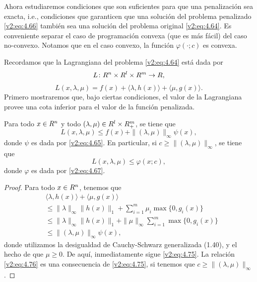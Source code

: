 Ahora estudiaremos condiciones que son suficientes para que una penalización sea exacta, i.e., condiciones que garanticen que una solución del problema penalizado \eqref{v2:eq:4.66} también sea una solución del problema original \eqref{v2:eq:4.64}. Es conveniente separar el caso de programación convexa (que es más fácil) del caso no-convexo. Notamos que en el caso convexo, la función $\varphi(\cdot; c)$ es convexa.

Recordamos que la Lagrangiana del problema \eqref{v2:eq:4.64} está dada por
\[
    L \colon R^n \times R^l \times R^m \to R,
\]
\[
    L(x, \lambda, \mu) = f(x) + \langle \lambda, h(x) \rangle + \langle \mu, g(x) \rangle.
\]
Primero mostraremos que, bajo ciertas condiciones, el valor de la Lagrangiana provee una cota inferior para el valor de la función penalizada.

\begin{proposition}\label{v2:prop:4.3.2}
    Para todo $x \in R^n$ y todo $(\lambda, \mu) \in R^l \times R^m_+$, se tiene que
    \begin{equation}
        L(x, \lambda, \mu) \le f(x) + \|(\lambda, \mu)\|_\infty \psi(x),
        \label{v2:eq:4.75}
    \end{equation}
    donde $\psi$ es dada por \eqref{v2:eq:4.65}. En particular, si $c \ge \|(\lambda, \mu)\|_\infty$, se tiene que
    \begin{equation}
        L(x, \lambda, \mu) \le \varphi(x; c),
        \label{v2:eq:4.76}
    \end{equation}
    donde $\varphi$ es dada por \eqref{v2:eq:4.67}.
\end{proposition}
\begin{proof}
    Para todo $x \in R^n$, tenemos que
    \begin{align*}
        &\langle \lambda, h(x) \rangle + \langle \mu, g(x) \rangle \\
        &\le \|\lambda\|_\infty \|h(x)\|_1 + \sum_{i=1}^m \mu_i \max\{0, g_i(x)\} \\
        &\le \|\lambda\|_\infty \|h(x)\|_1 + \|\mu\|_\infty \sum_{i=1}^m \max\{0, g_i(x)\} \\
        &\le \|(\lambda, \mu)\|_\infty \psi(x),
    \end{align*}
    donde utilizamos la desigualdad de Cauchy-Schwarz generalizada (1.40), y el hecho de que $\mu \ge 0$. De aquí, inmediatamente sigue \eqref{v2:eq:4.75}. La relación \eqref{v2:eq:4.76} es una consecuencia de \eqref{v2:eq:4.75}, si tenemos que $c \ge \|(\lambda, \mu)\|_\infty$.
\end{proof}

